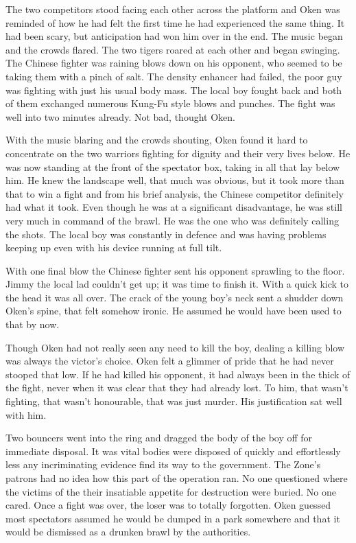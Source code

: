 The two competitors stood facing each other across the platform and Oken was reminded of how he had felt the first time he had experienced the same thing. It had been scary, but anticipation had won him over in the end. The music began and the crowds flared. The two tigers roared at each other and began swinging. The Chinese fighter was raining blows down on his opponent, who seemed to be taking them with a pinch of salt. The density enhancer had failed, the poor guy was fighting with just his usual body mass. The local boy fought back and both of them exchanged numerous Kung-Fu style blows and punches. The fight was well into two minutes already. Not bad, thought Oken.

With the music blaring and the crowds shouting, Oken found it hard to concentrate on the two warriors fighting for dignity and their very lives below. He was now standing at the front of the spectator box, taking in all that lay below him. He knew the landscape well, that much was obvious, but it took more than that to win a fight and from his brief analysis, the Chinese competitor definitely had what it took. Even though he was at a significant disadvantage, he was still very much in command of the brawl. He was the one who was definitely calling the shots. The local boy was constantly in defence and was having problems keeping up even with his device running at full tilt.

With one final blow the Chinese fighter sent his opponent sprawling to the floor. Jimmy the local lad couldn't get up; it was time to finish it. With a quick kick to the head it was all over. The crack of the young boy's neck sent a shudder down Oken's spine, that felt somehow ironic. He assumed he would have been used to that by now.

Though Oken had not really seen any need to kill the boy, dealing a killing blow was always the victor's choice. Oken felt a glimmer of pride that he had never stooped that low. If he had killed his opponent, it had always been in the thick of the fight, never when it was clear that they had already lost. To him, that wasn't fighting, that wasn't honourable, that was just murder. His justification sat well with him.

Two bouncers went into the ring and dragged the body of the boy off for immediate disposal. It was vital bodies were disposed of quickly and effortlessly less any incriminating evidence find its way to the government. The Zone's patrons had no idea how this part of the operation ran. No one questioned where the victims of the their insatiable appetite for destruction were buried. No one cared. Once a fight was over, the loser was to totally forgotten. Oken guessed most spectators assumed he would be dumped in a park somewhere and that it would be dismissed as a drunken brawl by the authorities.


